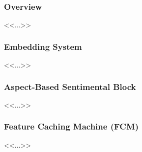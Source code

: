 \subsubsection{Overview}
<<...>>

\subsubsection{Embedding System}
<<...>>

\subsubsection{Aspect-Based Sentimental Block}
<<...>>

\subsubsection{Feature Caching Machine (FCM)}
<<...>>